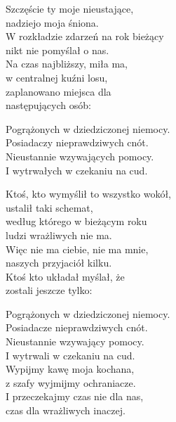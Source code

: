 \begin{text}
    Szczęście ty moje nieustające,\\
    nadziejo moja śniona.\\
    W rozkładzie zdarzeń na rok bieżący\\
    nikt nie pomyślał o nas.\\
    Na czas najbliższy, miła ma,\\
    w centralnej kuźni losu,\\
    zaplanowano miejsca dla\\
    następujących osób:

    Pogrążonych w dziedziczonej niemocy.\\
    Posiadaczy nieprawdziwych cnót.\\
    Nieustannie wzywających pomocy.\\
    I wytrwałych w czekaniu na cud.

    Ktoś, kto wymyślił to wszystko wokół,\\
    ustalił taki schemat,\\
    według którego w bieżącym roku\\
    ludzi wrażliwych nie ma.\\
    Więc nie ma ciebie, nie ma mnie,\\
    naszych przyjaciół kilku.\\
    Ktoś kto układał myślał, że\\
    zostali jeszcze tylko:

    Pogrążonych w dziedziczonej niemocy.\\
    Posiadacze nieprawdziwych cnót.\\
    Nieustannie wzywający pomocy.\\
    I wytrwali w czekaniu na cud.\\

    Wypijmy kawę moja kochana,\\
    z szafy wyjmijmy ochraniacze.\\
    I przeczekajmy czas nie dla nas,\\
    czas dla wrażliwych inaczej.
\end{text}
\begin{chord}

\end{chord}